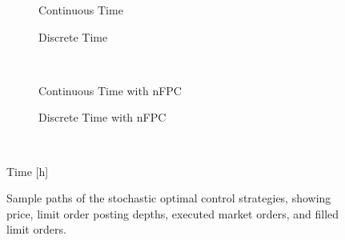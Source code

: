 \begin{figure}%
\centering%
\begin{subfigure}[b]{.4\linewidth}%
  \setlength\figureheight{\linewidth}%
  \setlength\figurewidth{\linewidth}%
  \caption{Continuous Time}%
\end{subfigure}%
\hspace{1.5cm}%
\begin{subfigure}[b]{.4\linewidth}%
  \setlength\figureheight{\linewidth}%
  \setlength\figurewidth{\linewidth}%
  \caption{Discrete Time}%
\end{subfigure}\\%
\vspace{1cm}%
\begin{subfigure}[b]{.4\linewidth}%
  \setlength\figureheight{\linewidth}%
  \setlength\figurewidth{\linewidth}%
  \caption{Continuous Time with nFPC}%
\end{subfigure}%
\hspace{1.5cm}%
\begin{subfigure}[b]{.4\linewidth}%
  \setlength\figureheight{\linewidth}%
  \setlength\figurewidth{\linewidth}%
  \caption{Discrete Time with nFPC}%
\end{subfigure}\\%
\leavevmode{}\hspace{0pt plus 1filll}\null%

Time [h]

\vspace{1cm}%
\begin{subfigure}{\linewidth}%
  \centering%
  \setlength\figureheight{\linewidth}%
  \setlength\figurewidth{\linewidth}%
\end{subfigure}%
  \caption[Detailed sample paths of the stochastic optimal control strategies]{Sample paths of the stochastic optimal control strategies, showing price, limit order posting depths, executed market orders, and filled limit orders.}\label{fig:samplepath_paths}%
\end{figure}
